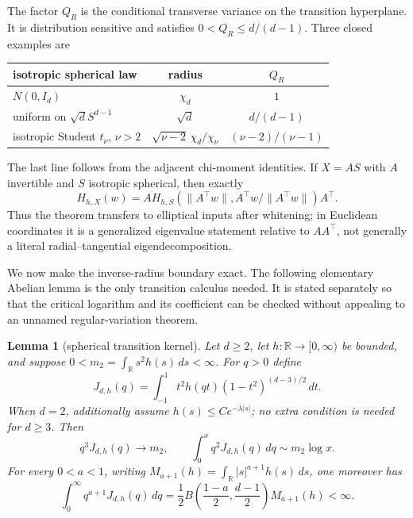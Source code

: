 \documentclass[11pt]{article}
\newtheorem{lemma}[theorem]{Lemma}
\newcommand{\R}{\mathbb R}
\begin{document}
The factor $Q_R$ is the conditional transverse variance on the transition hyperplane.  It is distribution
sensitive and satisfies $0<Q_R\le d/(d-1)$.  Three closed examples are
\begin{center}
\begin{tabular}{lcc}
\toprule
isotropic spherical law & radius & $Q_R$\\
\midrule
$N(0,I_d)$ & $\chi_d$ & $1$\\
uniform on $\sqrt dS^{d-1}$ & $\sqrt d$ & $d/(d-1)$\\
isotropic Student $t_\nu$, $\nu>2$ & $\sqrt{\nu-2}\,\chi_d/\chi_\nu$ & $(\nu-2)/(\nu-1)$\\
\bottomrule
\end{tabular}
\end{center}
The last line follows from the adjacent chi-moment identities.  If $X=AS$ with $A$ invertible and $S$ isotropic
spherical, then exactly
\[
 H_{h,X}(w)=A H_{h,S}(\lVert A^\top w\rVert,A^\top w/\lVert A^\top w\rVert)A^\top.
\]
Thus the theorem transfers to elliptical inputs after whitening; in Euclidean coordinates it is a generalized
eigenvalue statement relative to $AA^\top$, not generally a literal radial--tangential eigendecomposition.

We now make the inverse-radius boundary exact.  The following elementary Abelian lemma is the only transition
calculus needed.  It is stated separately so that the critical logarithm and its coefficient can be checked without
appealing to an unnamed regular-variation theorem.

\begin{lemma}[spherical transition kernel]
\label{lem:transitionkernel}
Let $d\ge2$, let $h:\R\to[0,\infty)$ be bounded, and suppose
$0<m_2=\int_\R s^2h(s)\,ds<\infty$.  For $q>0$ define
\[
 J_{d,h}(q)=\int_{-1}^1t^2h(qt)(1-t^2)^{(d-3)/2}\,dt.
\]
When $d=2$, additionally assume $h(s)\le Ce^{-\lambda|s|}$; no extra condition is needed for $d\ge3$.  Then
\begin{equation}
 q^3J_{d,h}(q)\longrightarrow m_2,
 \qquad
 \int_0^xq^2J_{d,h}(q)\,dq\sim m_2\log x.
 \label{eq:kernellimits}
\end{equation}
For every $0<a<1$, writing $M_{a+1}(h)=\int_\R|s|^{a+1}h(s)\,ds$, one moreover has
\begin{equation}
 \int_0^\infty q^{a+1}J_{d,h}(q)\,dq
 =\frac12B\!\left(\frac{1-a}{2},\frac{d-1}{2}\right)M_{a+1}(h)<\infty.
 \label{eq:kernelfactor}
\end{equation}
\end{lemma}
\end{document}
